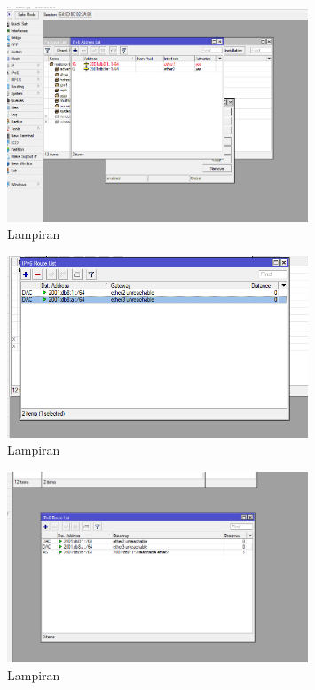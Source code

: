 \begin{figure}
    \centering
    \includegraphics[width=0.8\textwidth]{P1/img/dokum3.png}
    \caption{Lampiran}
    \label{fig:hasil_routing_dinamis_ipv6_5}
\end{figure}
\begin{figure}
    \centering
    \includegraphics[width=0.8\textwidth]{P1/img/dokum4.png}
    \caption{Lampiran}
    \label{fig:hasil_routing_dinamis_ipv6_6}
\end{figure}
\begin{figure}
    \centering
    \includegraphics[width=0.8\textwidth]{P1/img/dokum5.png}
    \caption{Lampiran}
    \label{fig:hasil_routing_dinamis_ipv6_7}
\end{figure}